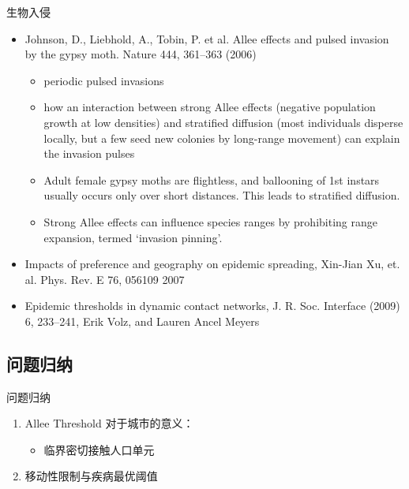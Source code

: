 \begin{frame}{生物入侵}
    \begin{itemize}
        \item Johnson, D., Liebhold, A., Tobin, P. et al. Allee effects and pulsed invasion by the gypsy moth. Nature 444, 361–363 (2006)
        \begin{itemize}
            \item periodic pulsed invasions
            \item how an interaction between strong Allee effects (negative population growth at low densities) and stratified diffusion (most individuals disperse locally, but a few seed new colonies by long-range movement) can explain the invasion pulses
            \item Adult female gypsy moths are flightless, and ballooning of 1st instars usually occurs only over short distances. This leads to stratified diffusion. 
            \item Strong Allee effects can influence species ranges by prohibiting range expansion, termed `invasion pinning'.
        \end{itemize}
        \item Impacts of preference and geography on epidemic spreading, Xin-Jian Xu, et. al. Phys. Rev. E 76, 056109 2007
        \item Epidemic thresholds in dynamic contact networks, J. R. Soc. Interface (2009) 6, 233–241, Erik Volz, and Lauren Ancel Meyers
    \end{itemize}
\end{frame}
\subsection{问题归纳}

\begin{frame}{问题归纳}
    \begin{enumerate}
        \item Allee Threshold 对于城市的意义：
        \begin{itemize}
            \item 临界密切接触人口单元
        \end{itemize}
        \item 移动性限制与疾病最优阈值
    \end{enumerate}
\end{frame}